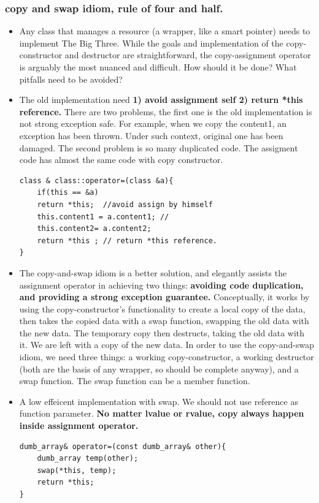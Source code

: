 \documentclass[a4paper,11pt,twoside]{book}
\begin{document}
\subsubsection{copy and swap idiom, rule of four and half.}
\begin{itemize}
	\item Any class that manages a resource (a wrapper, like a smart pointer) needs to implement The Big Three. While the goals and implementation of the copy-constructor and destructor are straightforward, the copy-assignment operator is arguably the most nuanced and difficult. How should it be done? What pitfalls need to be avoided?
	
	\item The old implementation need  \textbf{1) avoid assignment self 2) return *this reference. }There are two problems, the first one is the old implementation is not strong exception safe. For example, when we copy the content1, an exception has been thrown. Under such context, original one has been damaged. The second problem is so many duplicated code. The assigment code has almost the same code with copy constructor.
\begin{lstlisting}[numbers=none]
class & class::operator=(class &a){
	if(this == &a)
	return *this;  //avoid assign by himself
    this.content1 = a.content1; //
    this.content2= a.content2; 
	return *this ; // return *this reference.
}	
\end{lstlisting}
	
	\item The copy-and-swap idiom is a better solution, and elegantly assists the assignment operator in achieving two things: \textbf{avoiding code duplication, and providing a strong exception guarantee.}  Conceptually, it works by using the copy-constructor's functionality to create a local copy of the data, then takes the copied data with a swap function, swapping the old data with the new data. The temporary copy then destructs, taking the old data with it. We are left with a copy of the new data. In order to use the copy-and-swap idiom, we need three things: a working copy-constructor, a working destructor (both are the basis of any wrapper, so should be complete anyway), and a swap function. The swap function can be a member function.
    \item A low effeicent implementation with swap. We should not use reference as function parameter. \textbf{No matter lvalue or rvalue, copy always happen inside assignment operator.}
\begin{lstlisting}[numbers=none]
dumb_array& operator=(const dumb_array& other){
	dumb_array temp(other);
	swap(*this, temp);
	return *this;
}	


\end{lstlisting}
\end{itemize}
\end{document}
